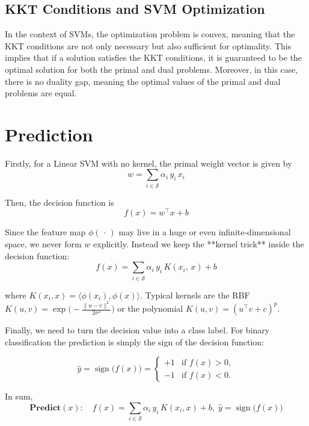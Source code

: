 \subsection{KKT Conditions and SVM Optimization}

In the context of SVMs, the optimization problem is convex, meaning that the KKT conditions are not only necessary but also sufficient for optimality. This implies that if a solution satisfies the KKT conditions, it is guaranteed to be the optimal solution for both the primal and dual problems. Moreover, in this case, there is no duality gap, meaning the optimal values of the primal and dual problems are equal.

\section{Prediction}

Firstly, for a Linear SVM with no kernel, the primal weight vector is given by
$$ w=\sum_{i\in \mathcal S}\alpha_i\,y_i\,x_i $$

Then, the decision function is
$$ f(x)=w^{\!\top}x + b $$

Since the feature map $\phi(\,\cdot\,)$ may live in a huge or even infinite-dimensional space, we never form $w$ explicitly. Instead we keep the **kernel trick** inside the decision function:
$$ f(x)=\sum_{i\in\mathcal S}\alpha_i\,y_i\,K(x_i,\,x)+b $$

where $K(x_i,x)=\langle\phi(x_i),\phi(x)\rangle$.
Typical kernels are the RBF $K(u,v)=\exp\!\bigl(-\frac{\|u-v\|^2}{2\sigma^2}\bigr)$ or the polynomial $K(u,v)=(u^{\!\top}v+c)^p$.

Finally, we need to turn the decision value into a class label. For binary classification the prediction is simply the sign of the decision function:

$$
\hat y = \operatorname{sign}\bigl(f(x)\bigr) = 
\begin{cases}
+1 &\text{if }f(x)\gt 0,\\[4pt]
-1 &\text{if }f(x)\lt 0.
\end{cases}
$$

In sum,
$$
\textbf{Predict}(x):
\quad f(x)=\sum_{i\in\mathcal S}\alpha_i\,y_i\,K(x_i,x)+b,\;
\hat y=\operatorname{sign}\bigl(f(x)\bigr)
$$



